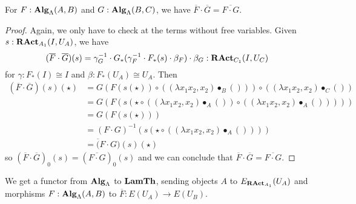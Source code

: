 \begin{lemma}
  For $ F : \mathbf{Alg}_{\Lambda}(A, B) $ and $ G: \mathbf{Alg}_{\Lambda}(B, C) $, we have $ \overline F \cdot \overline G = \overline{F \cdot G} $.
\end{lemma}
\begin{proof}
  Again, we only have to check at the terms without free variables. Given $ s : \mathbf{RAct}_{A_1}(I, U_A) $, we have
  \[ (\overline F \cdot \overline G)(s) = \gamma_G^{-1} \cdot G_*(\gamma_F^{-1} \cdot F_*(s) \cdot \beta_F) \cdot \beta_G: \mathbf{RAct}_{C_1}(I, U_C) \]
  for $ \gamma: F_*(I) \cong I $ and $ \beta: F_*(U_A) \cong U_A $. Then
  \begin{align*}
    (\overline F \cdot \overline G)(s)(\star)
    &= G(F(s(\star)) \circ ((\lambda x_1 x_2, x_2) \bullet_B ())) \circ ((\lambda x_1 x_2, x_2) \bullet_C ())\\
    &= G(F(s(\star \circ ((\lambda x_1 x_2, x_2) \bullet_A ()) \circ ((\lambda x_1 x_2, x_2) \bullet_A ()))))\\
    &= G(F(s(\star)))\\
    &= (F \cdot G)^{-1}(s(\star \circ ((\lambda x_1 x_2, x_2) \bullet_A ())))\\
    &= \overline(F \cdot G)(s)(\star)
  \end{align*}
  so $ (\overline F \cdot \overline G)_0(s) = (\overline{F \cdot G})_0(s) $ and we can conclude that $ \overline F \cdot \overline G = \overline{F \cdot G} $.
\end{proof}

\begin{definition}
  We get a functor from $ \mathbf{Alg}_{\Lambda} $ to $ \mathbf{LamTh} $, sending objects $ A $ to $ E_{\mathbf{RAct}_{A_1}}(U_A) $ and morphisms $ F: \mathbf{Alg}_{\Lambda}(A, B) $ to $ \overline F: E(U_A) \to E(U_B) $.
\end{definition}

